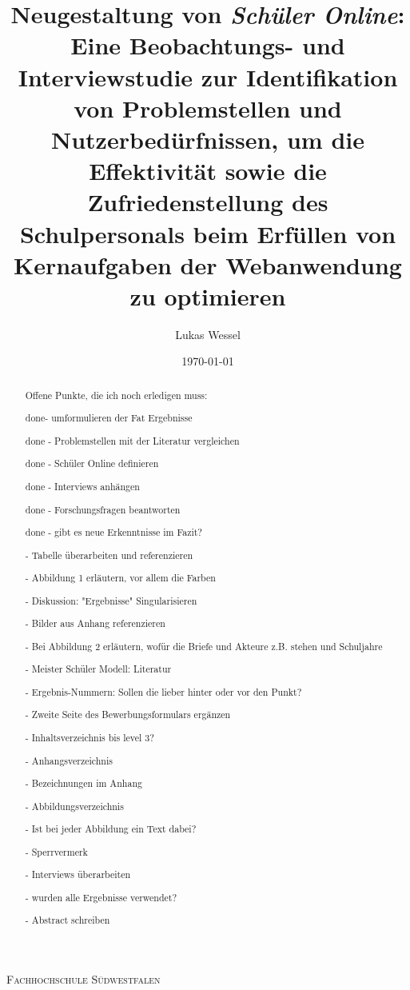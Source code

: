 \documentclass[pdftex,a4paper,abstracton,11pt,parskip=half,bibtotocnumbered]{scrartcl}
\title{Neugestaltung von \textit{Schüler Online}: Eine Beobachtungs- und Interviewstudie zur Identifikation von Problemstellen und Nutzerbedürfnissen, um die Effektivität sowie die Zufriedenstellung des Schulpersonals beim Erfüllen von Kernaufgaben der Webanwendung zu optimieren}
\author{Lukas Wessel}
\date{\today}
\begin{document}

\makeatletter
\begin{titlepage}
	\centering
	{\scshape\LARGE Fachhochschule Südwestfalen \par}
	\vspace{1cm}
	\vspace{1.5cm}
	{\huge\bfseries \@title\par}
	\vspace{3cm}
	{\Large \@author\par}
	\vspace{1cm}
	{\Large \@date\par}
	\vfill

	\raggedright
\end{titlepage}
\makeatother

\thispagestyle{empty}
\begin{abstract}
Offene Punkte, die ich noch erledigen muss:


done- umformulieren der Fat Ergebnisse 

done - Problemstellen mit der Literatur vergleichen

done - Schüler Online definieren

done - Interviews anhängen

done - Forschungsfragen beantworten

done - gibt es neue Erkenntnisse im Fazit?

- Tabelle überarbeiten und referenzieren

- Abbildung 1 erläutern, vor allem die Farben

- Diskussion: "Ergebnisse" Singularisieren 

- Bilder aus Anhang referenzieren

- Bei Abbildung 2 erläutern, wofür die Briefe und Akteure z.B. stehen und Schuljahre 

- Meister Schüler Modell: Literatur

- Ergebnis-Nummern: Sollen die lieber hinter oder vor den Punkt?

- Zweite Seite des Bewerbungsformulars ergänzen

- Inhaltsverzeichnis bis level 3?

- Anhangsverzeichnis

- Bezeichnungen im Anhang

- Abbildungsverzeichnis

- Ist bei jeder Abbildung ein Text dabei?

- Sperrvermerk

- Interviews überarbeiten

- wurden alle Ergebnisse verwendet?

- Abstract schreiben


\end{abstract}
\end{document}
